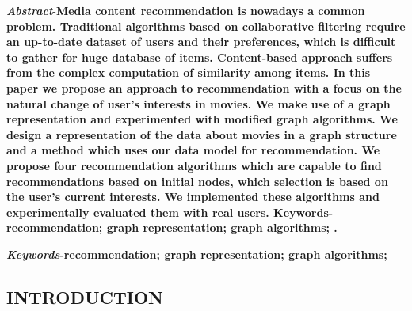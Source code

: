 \documentclass[10pt,slovak,a4paper]{article}
\begin{document}
\begin{multicols}{2}

\textbf{\textit{Abstract}}-\textbf{Media content recommendation is nowadays a common problem. Traditional algorithms based on collaborative filtering require an up-to-date dataset of users and their preferences, which is difficult to gather for huge database of items. Content-based approach suffers from the complex computation of similarity among items. In this paper we propose an approach to recommendation with a focus on the natural change of user’s interests in movies. We make use of a graph representation and experimented with modified graph algorithms. We design a representation of the data about movies in a graph structure and a method which uses our data model for recommendation. We propose four recommendation algorithms which are capable to find recommendations based on initial nodes, which selection is based on the user’s current interests. We implemented these algorithms and experimentally evaluated them with real users.
Keywords-recommendation; graph representation; graph algorithms;
.}
\\
\par \textbf{\textit{Keywords}-recommendation; graph representation; graph algorithms;}

\begin{small}

\centering 
\section{INTRODUCTION}

\end{small}


\end{multicols}
\end{document}
